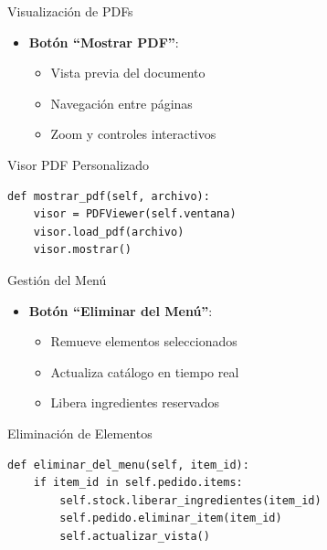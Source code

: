 \documentclass[12pt]{beamer}
\begin{document}
\begin{frame}[fragile]{Visualización de PDFs}
    \begin{itemize}
        \item \textbf{Botón ``Mostrar PDF''}:
        \begin{itemize}
            \item Vista previa del documento
            \item Navegación entre páginas
            \item Zoom y controles interactivos
        \end{itemize}
    \end{itemize}
    \begin{exampleblock}{Visor PDF Personalizado}
        \begin{verbatim}
def mostrar_pdf(self, archivo):
    visor = PDFViewer(self.ventana)
    visor.load_pdf(archivo)
    visor.mostrar()
        \end{verbatim}
    \end{exampleblock}
\end{frame}

\begin{frame}[fragile]{Gestión del Menú}
    \begin{itemize}
        \item \textbf{Botón ``Eliminar del Menú''}:
        \begin{itemize}
            \item Remueve elementos seleccionados
            \item Actualiza catálogo en tiempo real
            \item Libera ingredientes reservados
        \end{itemize}
    \end{itemize}
    \begin{exampleblock}{Eliminación de Elementos}
        \begin{verbatim}
def eliminar_del_menu(self, item_id):
    if item_id in self.pedido.items:
        self.stock.liberar_ingredientes(item_id)
        self.pedido.eliminar_item(item_id)
        self.actualizar_vista()
        \end{verbatim}
    \end{exampleblock}
\end{frame}
\end{document}

